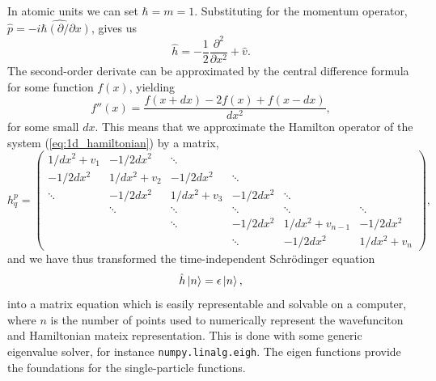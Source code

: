 In atomic units we can set $\hbar = m = 1$. Substituting for the 
momentum operator, $\hat{p} = \hat{-i\hbar (\partial / \partial x)}$, gives us 
\begin{equation}
    \label{eq:1d_hamiltonian}
    \hat{h} = - \frac{1}{2} \frac{\partial^2}{\partial x^2} + \hat{v}.
\end{equation}
The second-order derivate can be approximated by the central difference 
formula for some function $f(x)$, yielding
\begin{equation}
    f''(x) = \frac{f(x + dx) - 2f(x) +f(x - dx)}{dx^2},
\end{equation}
for some small $dx$. This means that we approximate the Hamilton 
operator of the system (\autoref{eq:1d_hamiltonian}) by a matrix,
\begin{equation}
    h^p_q =  \begin{pmatrix}
    1/dx^2 + v_1 & -1/2dx^2 & \ddots & & & \\
    -1/2dx^2 & 1/dx^2 + v_2 & -1/2dx^2 & \ddots & & \\
    \ddots & -1/2dx^2 & 1/dx^2 + v_3 & -1/2dx^2 & \ddots & \\
    & \ddots & \ddots & \ddots & \ddots & \ddots \\
    & & \ddots & -1/2dx^2 & 1/dx^2 + v_{n-1} & -1/2dx^2 \\
    & & & \ddots & -1/2dx^2 & 1/dx^2 + v_n
    \end{pmatrix},
\end{equation}
and we have thus transformed the time-independent Schrödinger equation
\begin{equation}
    \hat{h} \ket{n} = \epsilon \ket{n},
\end{equation}
into a matrix equation which is easily representable and solvable on a computer, where $n$ is 
the number of points used to numerically represent the wavefunciton 
and Hamiltonian mateix representation. This is done with some generic 
eigenvalue solver, for instance \lstinline{numpy.linalg.eigh}.
The eigen functions provide the foundations for the single-particle functions.

